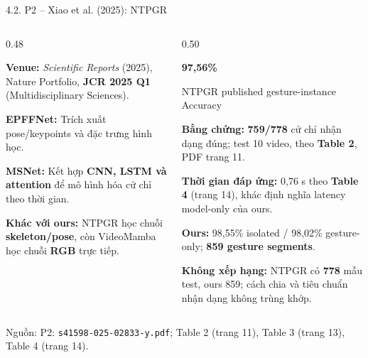 \documentclass[aspectratio=169,9pt]{beamer}
\newcommand{\smallnote}[1]{{\fontsize{7.1}{8.4}\selectfont #1\par}}
\newcommand{\srcn}[1]{{\fontsize{7.0}{8.2}\selectfont\color{Muted}Nguồn: #1}}
\begin{document}
\begin{frame}{4.2. P2 -- Xiao et al. (2025): NTPGR}
\begin{columns}[T,onlytextwidth]
\begin{column}{0.48\textwidth}
\begin{tcolorbox}[titlepanel,title=Phương pháp và vị thế công bố,height=5.00cm]
\smallnote{\textbf{Venue:} \emph{Scientific Reports} (2025), Nature Portfolio, \textbf{JCR 2025 Q1} (Multidisciplinary Sciences).}\par\vspace{0.15cm}
\smallnote{\textbf{EPFFNet:} Trích xuất pose/keypoints và đặc trưng hình học.}\par\vspace{0.13cm}
\smallnote{\textbf{MSNet:} Kết hợp \textbf{CNN, LSTM và attention} để mô hình hóa cử chỉ theo thời gian.}\par\vspace{0.15cm}
\smallnote{\textbf{Khác với ours:} NTPGR học chuỗi \textbf{skeleton/pose}, còn VideoMamba học chuỗi \textbf{RGB} trực tiếp.}
\end{tcolorbox}
\end{column}
\begin{column}{0.50\textwidth}
\begin{tcolorbox}[titlepanel,title=Evidence và kết quả,height=5.00cm]
\centering
{\fontsize{17}{19}\selectfont\bfseries\color{PTITRed} 97,56\%\par}
\smallnote{NTPGR published gesture-instance Accuracy}\par\vspace{0.11cm}
\smallnote{\textbf{Bằng chứng:} \textbf{759/778} cử chỉ nhận dạng đúng; test 10 video, theo \textbf{Table 2}, PDF trang 11.}\par\vspace{0.12cm}
\smallnote{\textbf{Thời gian đáp ứng:} 0,76 s theo \textbf{Table 4} (trang 14), khác định nghĩa latency model-only của ours.}\par\vspace{0.12cm}
\smallnote{\textbf{Ours:} 98,55\% isolated / 98,02\% gesture-only; \textbf{859 gesture segments}.}\par\vspace{0.10cm}
\smallnote{\textbf{Không xếp hạng:} NTPGR có \textbf{778} mẫu test, ours 859; cách chia và tiêu chuẩn nhận dạng không trùng khớp.}
\end{tcolorbox}
\end{column}
\end{columns}
\vspace{0.06cm}
\srcn{P2: \texttt{s41598-025-02833-y.pdf}; Table 2 (trang 11), Table 3 (trang 13), Table 4 (trang 14).}
\end{frame}
\end{document}
